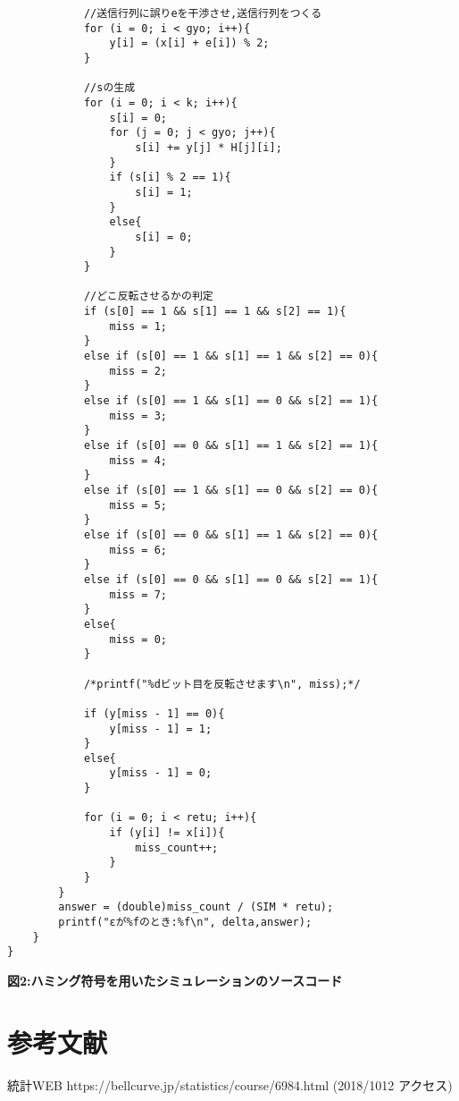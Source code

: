 \documentclass[12pt]{jarticle}
\begin{document}
\begin{center}
\begin{verbatim}
			//送信行列に誤りeを干渉させ,送信行列をつくる
			for (i = 0; i < gyo; i++){
				y[i] = (x[i] + e[i]) % 2;
			}
		
			//sの生成
			for (i = 0; i < k; i++){
				s[i] = 0;
				for (j = 0; j < gyo; j++){
					s[i] += y[j] * H[j][i];
				}
				if (s[i] % 2 == 1){
					s[i] = 1;
				}
				else{
					s[i] = 0;
				}
			}
		
			//どこ反転させるかの判定
			if (s[0] == 1 && s[1] == 1 && s[2] == 1){
				miss = 1;
			}
			else if (s[0] == 1 && s[1] == 1 && s[2] == 0){
				miss = 2;
			}
			else if (s[0] == 1 && s[1] == 0 && s[2] == 1){
				miss = 3;
			}
			else if (s[0] == 0 && s[1] == 1 && s[2] == 1){
				miss = 4;
			}
			else if (s[0] == 1 && s[1] == 0 && s[2] == 0){
				miss = 5;
			}
			else if (s[0] == 0 && s[1] == 1 && s[2] == 0){
				miss = 6;
			}
			else if (s[0] == 0 && s[1] == 0 && s[2] == 1){
				miss = 7;
			}
			else{
				miss = 0;
			}

			/*printf("%dビット目を反転させます\n", miss);*/

			if (y[miss - 1] == 0){
				y[miss - 1] = 1;
			}
			else{
				y[miss - 1] = 0;
			}
		
			for (i = 0; i < retu; i++){
				if (y[i] != x[i]){
					miss_count++;
				}
			}
		}
		answer = (double)miss_count / (SIM * retu);
		printf("εが%fのとき:%f\n", delta,answer);
	}
}
\end{verbatim}
\textbf{図2:ハミング符号を用いたシミュレーションのソースコード}
\end{center}

\section{参考文献}
\begin{thebibliography}{2}
\bibitem{} 統計WEB https://bellcurve.jp/statistics/course/6984.html (2018/1012 アクセス)
  \end{thebibliography}
\end{document}
